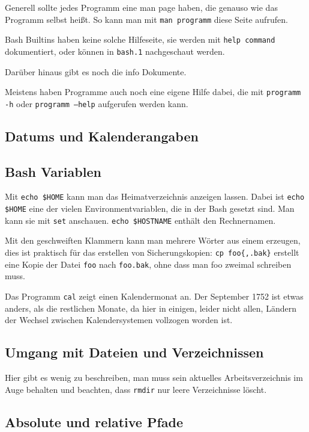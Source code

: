 \documentclass[10pt]{article}
\begin{document}
Generell sollte jedes Programm eine man page haben, die genauso wie das Programm selbst heißt. So kann man mit \texttt{man programm} diese Seite aufrufen.

Bash Builtins haben keine solche Hilfeseite, sie werden mit \texttt{help command} dokumentiert, oder können in \texttt{bash.1} nachgeschaut werden.

Darüber hinaus gibt es noch die info Dokumente.

Meistens haben Programme auch noch eine eigene Hilfe dabei, die mit \texttt{programm -h} oder \texttt{programm --help} aufgerufen werden kann.

\subsection{Datums und Kalenderangaben}

\subsection{Bash Variablen}

Mit \texttt{echo \${HOME}} kann man das Heimatverzeichnis anzeigen lassen. Dabei ist \texttt{echo \$HOME} eine der vielen Environmentvariablen, die in der Bash gesetzt sind. Man kann sie mit \texttt{set} anschauen. \texttt{echo \${HOSTNAME}} enthält den Rechnernamen.

Mit den geschweiften Klammern kann man mehrere Wörter aus einem erzeugen, dies ist praktisch für das erstellen von Sicherungskopien: \verb#cp foo{,.bak}# erstellt eine Kopie der Datei \texttt{foo} nach \texttt{foo.bak}, ohne dass man foo zweimal schreiben muss.

Das Programm \texttt{cal} zeigt einen Kalendermonat an. Der September 1752 ist etwas anders, als die restlichen Monate, da hier in einigen, leider nicht allen, Ländern der Wechsel zwischen Kalendersystemen vollzogen worden ist.

\subsection{Umgang mit Dateien und Verzeichnissen}

Hier gibt es wenig zu beschreiben, man muss sein aktuelles Arbeitsverzeichnis im Auge behalten und beachten, dass \texttt{rmdir} nur leere Verzeichnisse löscht.

\subsection{Absolute und relative Pfade}
\end{document}
